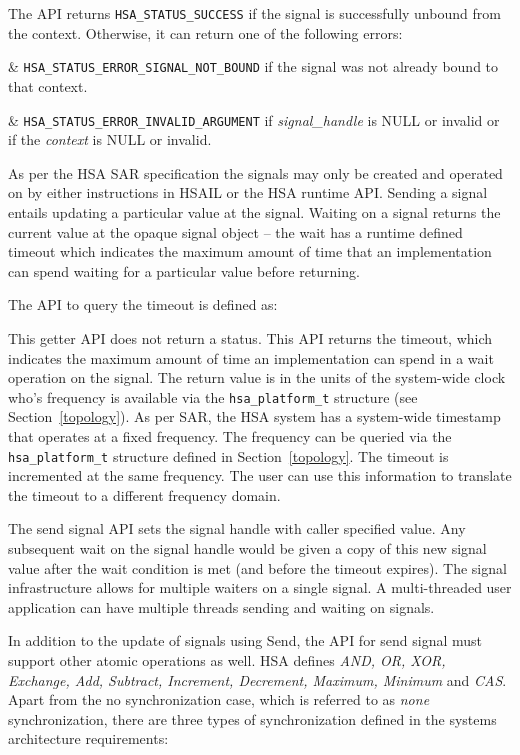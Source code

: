 \documentclass{book}
\newcommand{\diffblock}[1]{#1}
\newcommand{\dbtt}[1]{\diffblock{\texttt{#1}}}
\begin{document}
The API returns \texttt{HSA\_STATUS\_SUCCESS} if the signal is
successfully unbound from the context. Otherwise, it can return one
of the following errors:

\begin{easylist}
& \texttt{HSA\_STATUS\_ERROR\_SIGNAL\_NOT\_BOUND} if the signal was
not already bound to that context.

& \texttt{HSA\_STATUS\_ERROR\_INVALID\_ARGUMENT} if {\itshape
signal\_handle} is NULL or invalid or if the {\itshape context} is
NULL or invalid.
\end{easylist}

As per the HSA SAR specification the signals may only be created and
operated on by either instructions in HSAIL or the HSA runtime API.
Sending a signal entails updating a particular value at the signal.
Waiting on a signal returns the current value at the opaque signal
object -- the wait has a runtime defined timeout which indicates the
maximum amount of time that an implementation can spend waiting for
a particular value before returning.

The API to query the timeout is defined as:



This getter API does not return a status.  This API returns the
timeout, which indicates the maximum amount of time an
implementation can spend in a wait operation on the signal. The
return value is in the units of
the system-wide clock who's frequency is available via the
\dbtt{hsa\_platform\_t} structure (see Section~\ref{topology}). As
per SAR, the HSA system has a system-wide timestamp that operates at
a fixed frequency. The frequency can be
queried via the \texttt{hsa\_platform\_t} structure defined in
Section~\ref{topology}. The timeout is incremented at the same
frequency.  The user can use this information to translate the
timeout to a different frequency domain.

The send signal API sets the signal handle with caller specified
value. Any subsequent wait on the signal handle would be given
a copy of this new signal value after the wait condition
is met (and before the timeout expires).  The signal infrastructure
allows for multiple waiters on a single signal. A multi-threaded
user application can have multiple threads sending and waiting on
signals.

In addition to the update of signals using
Send, the API for send signal must support other atomic operations as
well. HSA defines \emph {AND, OR, XOR, Exchange, Add, Subtract,
Increment, Decrement, Maximum, Minimum} and \emph{CAS}. Apart from
the no synchronization case, which is referred to as \emph{none}
synchronization, there are three types of synchronization defined in
the systems architecture requirements:
\end{document}

